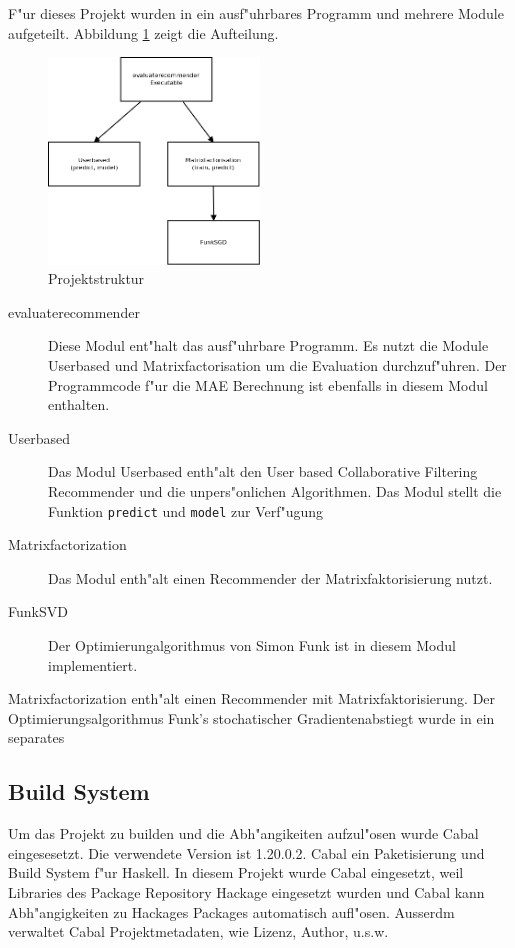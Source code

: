 \documentclass[a4paper, 12pt]{article}
\begin{document}
F"ur dieses Projekt wurden in ein ausf"uhrbares Programm und mehrere Module aufgeteilt. Abbildung \ref{fig:structur} zeigt die Aufteilung.

\begin{figure}
  \centering
      \includegraphics[width=0.5\textwidth]{structur}
  \caption{Projektstruktur}
  \label{fig:structur}
\end{figure}

\begin{description}
\item[evaluaterecommender] Diese Modul ent"halt das ausf"uhrbare Programm. Es nutzt die Module Userbased und Matrixfactorisation um die Evaluation durchzuf"uhren. Der Programmcode f"ur die MAE Berechnung ist ebenfalls in diesem Modul enthalten.
\item[Userbased] Das Modul Userbased enth"alt den User based Collaborative Filtering Recommender und die unpers"onlichen Algorithmen. Das Modul stellt die Funktion \verb|predict| und \verb|model| zur Verf"ugung
\item[Matrixfactorization] Das Modul enth"alt einen Recommender der Matrixfaktorisierung nutzt.
\item[FunkSVD] Der Optimierungalgorithmus von Simon Funk ist in diesem Modul implementiert.
\end{description}

Matrixfactorization enth"alt einen Recommender mit Matrixfaktorisierung. Der Optimierungsalgorithmus Funk's stochatischer Gradientenabstiegt wurde in ein separates 

\subsection{Build System}
\label{sec:cabal}

Um das Projekt zu builden und die Abh"angikeiten aufzul"osen wurde Cabal eingesesetzt. Die verwendete Version ist 1.20.0.2. Cabal ein Paketisierung und Build System f"ur Haskell. In diesem Projekt wurde Cabal eingesetzt, weil Libraries des Package Repository Hackage eingesetzt wurden und Cabal kann Abh"angigkeiten zu Hackages Packages automatisch aufl"osen. Ausserdm verwaltet Cabal Projektmetadaten, wie Lizenz, Author, u.s.w.
\end{document}
